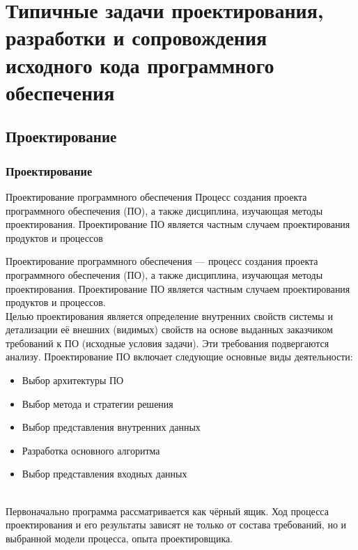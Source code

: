 \documentclass{../industrial-development}
\begin{document}
\section{Типичные задачи проектирования, разработки и сопровождения исходного кода программного обеспечения}
\subsection{Проектирование}
\begin{frame} \frametitle{Проектирование}
  \begin{block}{Проектирование программного обеспечения}
  	Процесс создания проекта программного обеспечения (ПО), а также дисциплина, изучающая методы проектирования. Проектирование ПО является частным случаем проектирования продуктов и процессов
  \end{block}
\end{frame}
\lecturenotes
Проектирование программного обеспечения — процесс создания проекта программного обеспечения (ПО), а также дисциплина, изучающая методы проектирования. Проектирование ПО является частным случаем проектирования продуктов и процессов.\\
Целью проектирования является определение внутренних свойств системы и детализации её внешних (видимых) свойств на основе выданных заказчиком требований к ПО (исходные условия задачи). Эти требования подвергаются анализу. 
Проектирование ПО включает следующие основные виды деятельности: \\
\begin{itemize}
	\item Выбор архитектуры ПО
	\item Выбор метода и стратегии решения
	\item Выбор представления внутренних данных
	\item Разработка основного алгоритма
	\item Выбор представления входных данных
\end{itemize}\\
Первоначально программа рассматривается как чёрный ящик. Ход процесса проектирования и его результаты зависят не только от состава требований, но и выбранной модели процесса, опыта проектировщика. 
\end{document}
